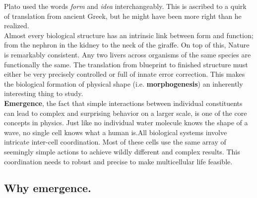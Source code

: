 Plato used the words \textit{form} and \textit{idea} interchangeably. This is ascribed to a quirk of translation from ancient Greek, but he might have been more right than he realized.\\ Almost every biological structure has an intrinsic link between form and function; from the nephron in the kidney to the neck of the giraffe.  
On top of this, Nature is remarkably consistent. Any two livers across organisms of the same species are functionally the same. The translation from blueprint to finished structure must either be very precisely controlled or full of innate error correction. This makes the biological formation of physical shape (i.e. \textbf{morphogenesis}) an inherently interesting thing to study. \\


\textbf{Emergence}, the fact that simple interactions between individual constituents can lead to complex and surprising behavior on a larger scale, is one of the core concepts in physics. Just like no individual water molecule knows the shape of a wave, no single cell knows what a human is.All biological systems involve intricate inter-cell coordination. Most of these cells use the same array of seemingly simple actions to achieve wildly different and complex results. This coordination needs to robust and precise to make multicellular life feasible.  \\









\subsection{Why emergence. }



